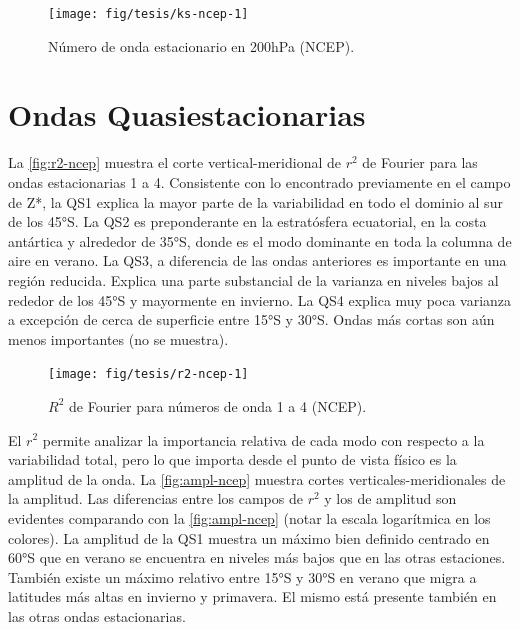 \documentclass[spanish,a4paper,12pt,oneside]{book}
\begin{document}
\begin{landscape}\begin{figure}

{\centering \texttt{[image: fig/tesis/ks-ncep-1]} 

}

\caption{Número de onda estacionario en 200hPa (NCEP).}\label{fig:ks-ncep}
\end{figure}
\end{landscape}

\section{Ondas Quasiestacionarias}\label{ondas-quasiestacionarias}

La \autoref{fig:r2-ncep} muestra el corte vertical-meridional de \(r^2\)
de Fourier para las ondas estacionarias 1 a 4. Consistente con lo
encontrado previamente en el campo de Z*, la QS1 explica la mayor parte
de la variabilidad en todo el dominio al sur de los 45°S. La QS2 es
preponderante en la estratósfera ecuatorial, en la costa antártica y
alrededor de 35°S, donde es el modo dominante en toda la columna de aire
en verano. La QS3, a diferencia de las ondas anteriores es importante en
una región reducida. Explica una parte substancial de la varianza en
niveles bajos al rededor de los 45°S y mayormente en invierno. La QS4
explica muy poca varianza a excepción de cerca de superficie entre 15°S
y 30°S. Ondas más cortas son aún menos importantes (no se muestra).

\begin{landscape}\begin{figure}

{\centering \texttt{[image: fig/tesis/r2-ncep-1]} 

}

\caption{$R^2$ de Fourier para números de onda 1 a 4 (NCEP).}\label{fig:r2-ncep}
\end{figure}
\end{landscape}

El \(r^2\) permite analizar la importancia relativa de cada modo con
respecto a la variabilidad total, pero lo que importa desde el punto de
vista físico es la amplitud de la onda. La \autoref{fig:ampl-ncep}
muestra cortes verticales-meridionales de la amplitud. Las diferencias
entre los campos de \(r^2\) y los de amplitud son evidentes comparando
con la \autoref{fig:ampl-ncep} (notar la escala logarítmica en los
colores). La amplitud de la QS1 muestra un máximo bien definido centrado
en 60°S que en verano se encuentra en niveles más bajos que en las otras
estaciones. También existe un máximo relativo entre 15°S y 30°S en
verano que migra a latitudes más altas en invierno y primavera. El mismo
está presente también en las otras ondas estacionarias.
\end{document}

